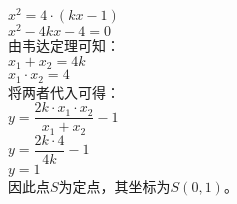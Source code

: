 \documentclass[UTF8]{ctexart}
\begin{document}
\begin{multicols}{2}
\begin{math}
        \end{math}\\[5mm]
        $x^2=4\cdot(kx-1)$\\[5mm]
        $x^2-4kx-4=0$\\[8mm]
        由韦达定理可知：\\[3mm]
        $x_1+x_2=4k$\\[5mm]
        $x_1\cdot x_2=4$\\[8mm]
        将两者代入可得：\\[3mm]
        $y=\dfrac{2k\cdot x_1\cdot x_2}{x_1+x_2}-1$\\[5mm]
        $y=\dfrac{2k\cdot 4}{4k}-1$\\[6mm]
        $y=1$\\[8mm]
        因此点$S$为定点，其坐标为$S(0,1)$。
        \newpage
    \end{multicols}

\newpage
\end{document}
